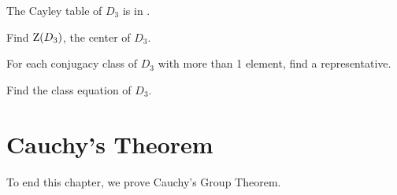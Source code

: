 \begin{exercise}
    The Cayley table of $D_3$ is in .
    \begin{partquestions}{\alph*}
        \item Find $\mathrm{Z}(D_3)$, the center of $D_3$.
        \item For each conjugacy class of $D_3$ with more than 1 element, find a representative.
        \item Find the class equation of $D_3$.
    \end{partquestions}
\end{exercise}

\section{Cauchy's Theorem}
To end this chapter, we prove Cauchy's Group Theorem.

